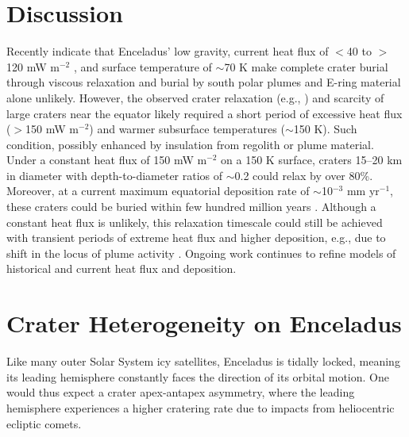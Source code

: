 \documentclass[preprint,12pt,3p,times,authoryear]{elsarticle}
\begin{document}

\section{Discussion}

Recently \citet{Bland2012,Martin2023} indicate that Enceladus’ low gravity, current heat flux of $<$40 to $>$120 mW m$^{-2}$ \citep{Cadek2019,Kinczyk2024}, and surface temperature of $\sim$70 K make complete crater burial through viscous relaxation and burial by south polar plumes and E-ring material alone unlikely. However, the observed crater relaxation (e.g., \citealt{Bland2012}) and scarcity of large craters near the equator likely required a short period of excessive heat flux ($>$150 mW m$^{-2}$) and warmer subsurface temperatures ($\sim$150 K). Such condition, possibly enhanced by insulation from regolith or plume material. Under a constant heat flux of 150 mW m$^{-2}$ on a 150 K surface, craters 15–20 km in diameter with depth-to-diameter ratios of $\sim$0.2 could relax by over 80\%. Moreover, at a current maximum equatorial deposition rate of $\sim$10$^{-3}$ mm yr$^{-1}$, these craters could be buried within few hundred million years \citep{Bland2012}. Although a constant heat flux is unlikely, this relaxation timescale could still be achieved with transient periods of extreme heat flux and higher deposition, e.g., due to shift in the locus of plume activity \citep{Bland2012}. Ongoing work continues to refine models of historical and current heat flux and deposition.


\section{Crater Heterogeneity on Enceladus}
\label{app:hetero}
Like many outer Solar System icy satellites, Enceladus is tidally locked, meaning its leading hemisphere constantly faces the direction of its orbital motion. One would thus expect a crater apex-antapex asymmetry, where the leading hemisphere experiences a higher cratering rate due to impacts from heliocentric ecliptic comets.\\
\end{document}
